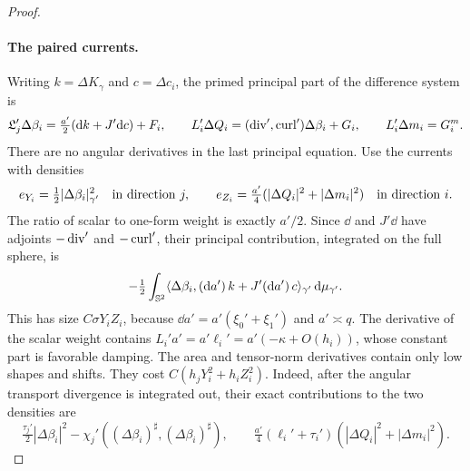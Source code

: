 \begin{proof}
\paragraph{The paired currents.}
Writing $k=\Delta K_\gamma$ and $c=\Delta c_i$, the primed
principal part of the difference system is
\[
 \mathfrak L_j'\Delta\beta_i
        =\tfrac{a'}2(\mathrm d k+J'\mathrm d c)+F_i,
 \qquad
 L_i'\Delta Q_i=(\operatorname{div}',\operatorname{curl}')\Delta\beta_i+G_i,
 \qquad L_i'\Delta m_i=G_i^m.
\]
There are no angular derivatives in the last principal equation.
Use the currents with densities
\begin{equation}\label{dn:pair-densities}
 e_{Y_i}=\tfrac12|\Delta\beta_i|_{\gamma'}^2
                 \quad\hbox{in direction }j,
 \qquad
 e_{Z_i}=\tfrac{a'}4
       (|\Delta Q_i|^2+|\Delta m_i|^2)
                 \quad\hbox{in direction }i.
\end{equation}
The ratio of scalar to one-form weight is exactly $a'/2$.
Since $\dd$ and $J'\dd$ have adjoints $-\operatorname{div}'$ and $-\operatorname{curl}'$,
their principal contribution, integrated on the full sphere, is
\begin{equation}\label{dn:principal-cancellation}
 -\tfrac12\int_{\mathbb S^2}
 \langle\Delta\beta_i,
       (\mathrm d a')\,k+J'(\mathrm d a')\,c\rangle_{\gamma'}\,\mathrm d\mu_{\gamma'}.
\end{equation}
This has size $C\sigma Y_iZ_i$, because
$\dd a'=a'(\xi_0'+\xi_1')$ and $a'\asymp q$.
The derivative of the scalar weight contains
$L_i'a'=a'\ell_i'=a'(-\kappa+O(h_i))$, whose constant part is
favorable damping.  The area and tensor-norm derivatives contain
only low shapes and shifts.  They cost
$C(h_jY_i^2+h_iZ_i^2)$.
Indeed, after the angular transport divergence is integrated out,
their exact contributions to the two densities are
\[
 \tfrac{\tau_j'}2|\Delta\beta_i|^2
       -\chi_j'((\Delta\beta_i)^\sharp,(\Delta\beta_i)^\sharp),
 \qquad
 \tfrac{a'}4(\ell_i'+\tau_i')
                         (|\Delta Q_i|^2+|\Delta m_i|^2).
\]


\end{proof}
